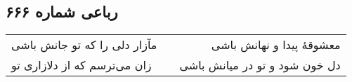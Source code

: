 \begin{center}
\section*{رباعی شماره ۶۶۶}
\label{sec:sh666}
\begin{longtable}{l p{0.5cm} r}
مآزار دلی را که تو جانش باشی
&&
معشوقهٔ پیدا و نهانش باشی
\\
زان می‌ترسم که از دلازاری تو
&&
دل خون شود و تو در میانش باشی
\\
\end{longtable}
\end{center}

